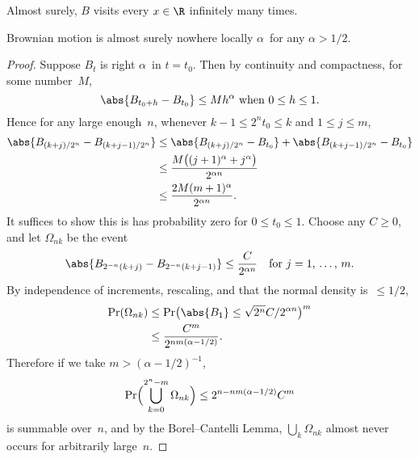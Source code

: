 \begin	{corollary}
Almost surely, $B$ visits every \( x \in \R \) infinitely many times.
\end	{corollary}

\begin	{theorem}
\label	{thm:nowhere-holder}
	Brownian motion is almost surely nowhere locally $\alpha$\dashHolder\
	for any \( \alpha > 1/2 \).
\end	{theorem}
\begin	{proof}
Suppose $B_t$ is right $\alpha$\dashHolder\ in \( t = t_0 \).
Then by continuity and compactness, for some number~$M$, \[
	\text{\( \abs{B_{t_0+h} - B_{t_0}} \le Mh^\alpha \)
		when \(0 \le h \le 1 \).}
\]
Hence for any large enough~$n$,
whenever \( k-1 \le 2^n t_0 \le k \) and \( 1 \le j \le m \),
\begin	{align*}
	\abs{ B_{(k+j)/2^n} - B_{(k+j-1)/2^n} }
	&\le	\abs{ B_{(k+j)/2^n} - B_{t_0} }
		+ \abs { B_{(k+j-1)/2^n} - B_{t_0} } \\
	&\le	\frac {M\bigl((j+1)^\alpha+j^\alpha\bigr)} {2^{\alpha n}} \\
	&\le	\frac {2M(m+1)^\alpha} {2^{\alpha n}}
	\text.
\end	{align*}
It suffices to show this is has probability zero
for \( 0 \le t_0 \le 1 \).
Choose any \( C \ge 0 \), and let $\Omega_{nk}$ be the event \[
	\abs{ B_{2^{-n}(k+j)} - B_{2^{-n}(k+j-1)} } \le
		\frac C {2^{\alpha n}}
	\quad \text{for \( j = 1 \), \dots,~$m$.}
\]
By independence of increments, rescaling,
and that the normal density is~\( \le 1/2 \),
\begin	{align*}
	\Pr(\Omega_{nk}) &\le \Pr\bigl(
		\abs{B_1} \le \sqrt{2^n} C / 2^{\alpha n} \bigr)^m \\
	&\le	\frac {C^m} {2^{nm(\alpha-1/2)}}
	\text.
\end	{align*}
Therefore if we take \( m > (\alpha-1/2)^{-1} \), \[
	\Pr\Bigl( \bigcup_{k=0}^{2^n-m} \Omega_{nk} \Bigr)
	\le 2^{n - nm(\alpha-1/2)} C^m
\] is summable over~$n$,
and by the Borel--Cantelli Lemma,
$\bigcup_k \Omega_{nk}$ almost never occurs for arbitrarily large~$n$.
\end	{proof}

